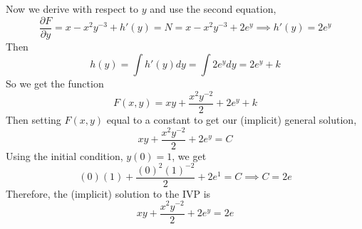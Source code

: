 \documentclass[openany]{report}
\begin{document}
Now we derive with respect to $y$ and use the second equation, 
\[\frac{\partial F}{\partial y} = x - x^2y^{-3} + h'(y) = N = x - x^2y^{-3} + 2e^y \implies h'(y) = 2e^y\]
Then 
\[h(y) = \int h'(y)dy = \int 2e^ydy = 2e^{y} + k\]
So we get the function 
\[F(x,y) = xy + \frac{x^2y^{-2}}{2} + 2e^y + k\]
Then setting $F(x,y)$ equal to a constant to get our (implicit) general solution, 
\[xy+ \frac{x^2y^{-2}}{2} + 2e^y = C\]
Using the initial condition, $y(0) = 1$, we get
\[(0)(1) + \frac{(0)^2(1)^{-2}}{2} + 2e^{1} = C \implies C = 2e\]
Therefore, the (implicit) solution to the IVP is
\[xy+ \frac{x^2y^{-2}}{2} + 2e^y = 2e\]
\end{document}
